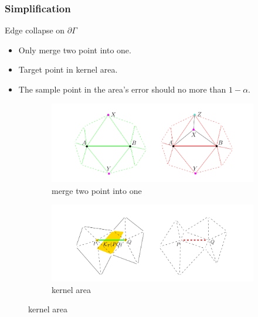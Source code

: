 \documentclass{beamer}
\begin{document}
\begin{frame}
\frametitle{Simplification}
\begin{block}{Edge collapse on $\partial \Gamma$}
  \begin{itemize}
    \item Only merge two point into one.
    \item Target point in kernel area.
    \item The sample point in the area's error should no more than $1-\alpha$.
  \end{itemize}
\end{block}

\begin{figure}
  \centering
  \begin{subfigure}[b]{0.48\textwidth}
    \centering
    \includegraphics[width=\textwidth]{merge_two}
    \caption{merge two point into one}
  \end{subfigure}
  \hfill
  \begin{subfigure}[b]{0.48\textwidth}
    \centering
    \includegraphics[width=\textwidth]{kernel_area}
    \caption{kernel area}
  \end{subfigure}
\end{figure}
\end{frame}

\end{document}

